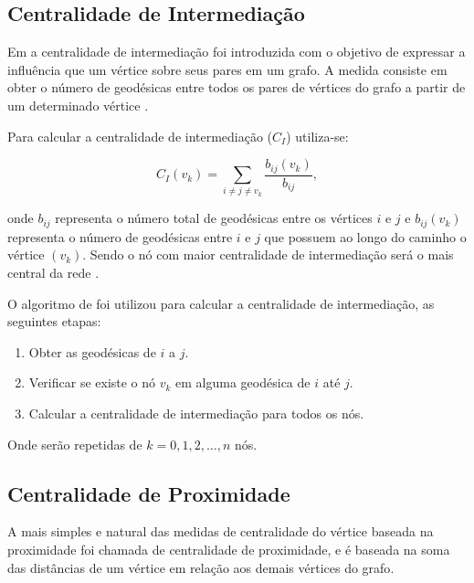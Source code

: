 \documentclass[12pt]{article}
\begin{document}
\subsection{Centralidade de Intermediação}
Em \cite{freitas} a centralidade de intermediação foi introduzida com o objetivo de expressar a influência que um vértice sobre seus pares em um grafo.
A medida consiste em obter o número de geodésicas entre todos os pares de vértices do grafo a partir de um determinado vértice \cite{freitas}.

Para calcular a centralidade de intermediação ($C_I$) utiliza-se: 
\begin{center}
\begin{equation}
C_I(v_k)=\sum_{i\neq j \neq v_{k}} \frac{b_{ij}(v_k)}{b_{ij}},
\end{equation}
\end{center}
onde $b_{ij}$ representa o número total de geodésicas entre os vértices $i$ e $j$ e  $b_{ij}(v_k)$ representa o número de geodésicas entre $i$ e $j$ que possuem ao longo do caminho o vértice $(v_k)$.
Sendo o nó com maior centralidade de intermediação será o mais central da rede \cite{ufimtsev} \cite{freeman}.

O algoritmo de \cite{Brandes01afaster} foi utilizou para calcular a centralidade de intermediação, as seguintes etapas:
\begin{enumerate}
\item Obter as geodésicas de $i$ a $j$.
\item Verificar se existe o nó $v_k$ em alguma geodésica de $i$ até $j$.
\item Calcular a centralidade de intermediação para todos os nós.
\end{enumerate}
Onde serão repetidas de $k = 0,1,2,\dots,n$ nós.




\subsection{Centralidade de Proximidade}
A mais simples e natural das medidas de centralidade do vértice baseada na proximidade foi chamada de centralidade de proximidade, e é baseada na soma das distâncias de um  vértice em relação aos demais vértices do grafo\cite{freitas}.
\end{document}
